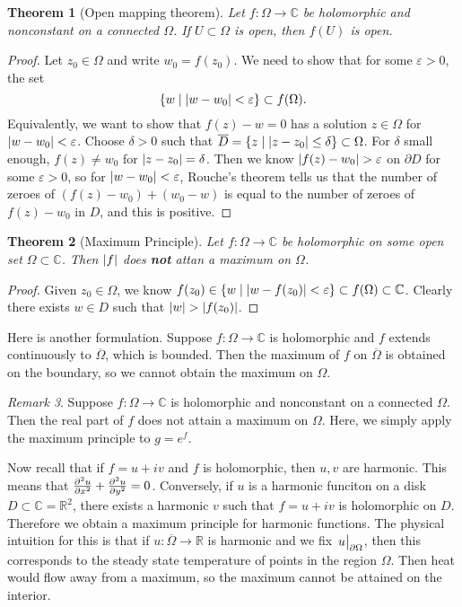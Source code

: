 \documentclass[leqno, openany]{memoir}
\newtheorem{thm}{Theorem}[section]
\theoremstyle{definition}
\theoremstyle{remark}
\newtheorem{rmk}[thm]{Remark}
\theoremstyle{plain}
\theoremstyle{definition}
\theoremstyle{remark}
\newcommand{\R}{\mathbb{R}}
\newcommand{\C}{\mathbb{C}}
\newcommand{\ep}{\varepsilon}
\newcommand{\ol}[1]{\overline{#1}}
\begin{document}
\begin{thm}[Open mapping theorem] Let $f \colon \Omega \to \C$ be holomorphic
and nonconstant on a connected $\Omega$. If $U \subset \Omega$ is open, then
$f(U)$ is open.  \end{thm}

\begin{proof} Let $z_0 \in \Omega$ and write $w_0 = f(z_0)$. We need to show
    that for some $\ep > 0$, the set \[ \qty{w \mid \abs{w-w_0} < \ep} \subset
    f(\Omega). \] Equivalently, we want to show that $f(z) - w = 0$ has a
    solution $z \in \Omega$ for $\abs{w-w_0} < \ep$. Choose $\delta > 0$ such
    that $\ol{D} = \qty{z \mid \abs{z-z_0} \leq \delta} \subset \Omega$. For
    $\delta$ small enough, $f(z) \neq w_0$ for $\abs{z-z_0} = \delta$. Then we
    know $\abs{f(z) - w_0} > \ep$ on $\partial D$ for some $\ep > 0$, so for
    $\abs{w-w_0} < \ep$, Rouche's theorem tells us that the number of zeroes of
    $(f(z) - w_0) + (w_0 - w)$ is equal to the number of zeroes of $f(z) - w_0$
    in $D$, and this is positive.  \end{proof}

\begin{thm}[Maximum Principle] Let $f \colon \Omega \to \C$ be holomorphic on
some open set $\Omega \subset \C$. Then $\abs{f}$ does \textbf{not} attan a
maximum on $\Omega$.  \end{thm}

\begin{proof} Given $z_0 \in \Omega$, we know $f(z_0) \in \qty{w \mid \abs{w -
f(z_0)} < \ep} \subset f(\Omega) \subset \C$. Clearly there exists $w \in D$
such that $\abs{w} > \abs{f(z_0)}$.  \end{proof}

Here is another formulation. Suppose $f \colon \Omega \to \C$ is holomorphic
and $f$ extends continuously to $\ol{\Omega}$, which is bounded. Then the
maximum of $f$ on $\ol{\Omega}$ is obtained on the boundary, so we cannot
obtain the maximum on $\Omega$.

\begin{rmk} Suppose $f \colon \Omega \to \C$ is holomorphic and nonconstant on
a connected $\Omega$. Then the real part of $f$ does not attain a maximum on
$\Omega$. Here, we simply apply the maximum principle to $g = e^f$.  \end{rmk}

Now recall that if $f = u + iv$ and $f$ is holomorphic, then $u, v$ are
harmonic. This means that $\pdv[2]{u}{x} + \pdv[2]{u}{y} = 0$. Conversely, if
$u$ is a harmonic funciton on a disk $D \subset \C = \R^2$, there exists a
harmonic $v$ such that $f = u+iv$ is holomorphic on $D$. Therefore we obtain a
maximum principle for harmonic functions. The physical intuition for this is
that if $u \colon \ol{\Omega} \to \R$ is harmonic and we fix
$\eval{u}_{\partial \Omega}$, then this corresponds to the steady state
temperature of points in the region $\Omega$. Then heat would flow away from a
maximum, so the maximum cannot be attained on the interior.
\end{document}
